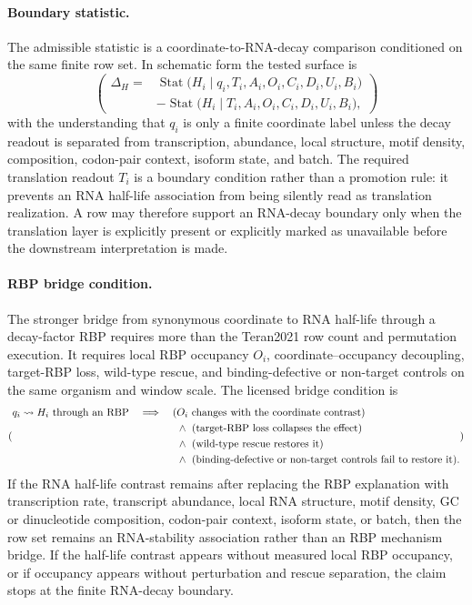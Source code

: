 \paragraph{Boundary statistic.}
The admissible statistic is a coordinate-to-RNA-decay comparison conditioned on the same finite row set.  In schematic form the tested surface is
$$(\begin{aligned}
  \Delta_H
  ={}& \operatorname{Stat}\bigl(H_i \mid q_i, T_i, A_i, O_i, C_i, D_i, U_i, B_i\bigr)\\
     &- \operatorname{Stat}\bigl(H_i \mid T_i, A_i, O_i, C_i, D_i, U_i, B_i\bigr),
\end{aligned})$$
with the understanding that $q_i$ is only a finite coordinate label unless the decay readout is separated from transcription, abundance, local structure, motif density, composition, codon-pair context, isoform state, and batch.  The required translation readout $T_i$ is a boundary condition rather than a promotion rule: it prevents an RNA half-life association from being silently read as translation realization.  A row may therefore support an RNA-decay boundary only when the translation layer is explicitly present or explicitly marked as unavailable before the downstream interpretation is made.

\paragraph{RBP bridge condition.}
The stronger bridge from synonymous coordinate to RNA half-life through a decay-factor RBP requires more than the Teran2021 row count and permutation execution.  It requires local RBP occupancy $O_i$, coordinate--occupancy decoupling, target-RBP loss, wild-type rescue, and binding-defective or non-target controls on the same organism and window scale.  The licensed bridge condition is
$$(\begin{aligned}
  q_i \leadsto H_i\ \hbox{through an RBP}
  \quad\Longrightarrow\quad
  (&O_i\ \hbox{changes with the coordinate contrast})\\
  &\wedge\ (\hbox{target-RBP loss collapses the effect})\\
  &\wedge\ (\hbox{wild-type rescue restores it})\\
  &\wedge\ (\hbox{binding-defective or non-target controls fail to restore it}).
\end{aligned})$$
If the RNA half-life contrast remains after replacing the RBP explanation with transcription rate, transcript abundance, local RNA structure, motif density, GC or dinucleotide composition, codon-pair context, isoform state, or batch, then the row set remains an RNA-stability association rather than an RBP mechanism bridge.  If the half-life contrast appears without measured local RBP occupancy, or if occupancy appears without perturbation and rescue separation, the claim stops at the finite RNA-decay boundary.

